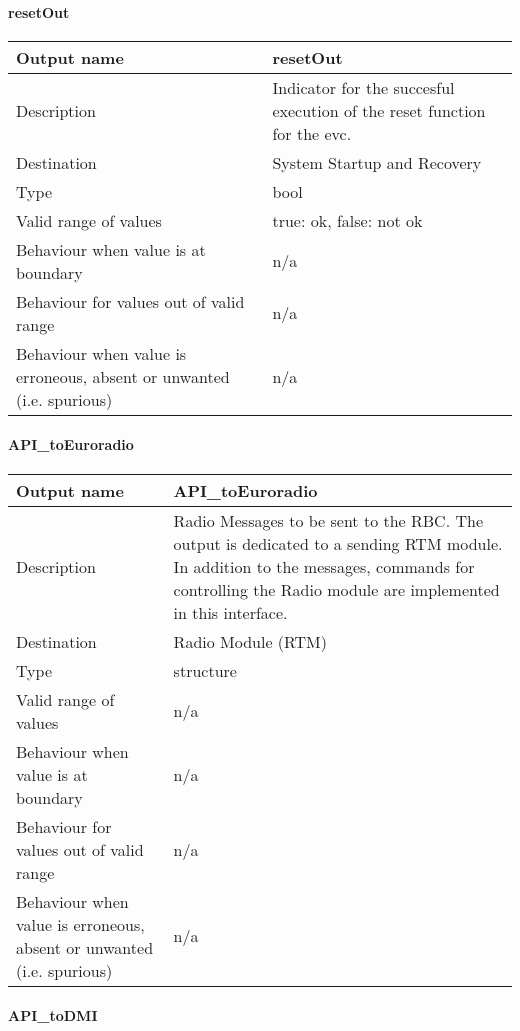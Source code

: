 \paragraph{resetOut}

\begin{longtable}{p{}p{}}
\toprule
Output name				& resetOut \\
\midrule
Description				& Indicator for the succesful execution of the reset function for the evc. \\
\midrule
Destination				& System Startup and Recovery \\ 
\midrule
Type					& bool \\
\midrule
Valid range of values	& true: ok, false: not ok \\
\midrule
Behaviour when value is at boundary	& n/a \\
\midrule
Behaviour for values out of valid range	& n/a \\
\midrule
Behaviour when value is erroneous, absent or unwanted (i.e. spurious) & n/a \\
\bottomrule
\end{longtable}


\paragraph{API\_toEuroradio}

\begin{longtable}{p{}p{}}
\toprule
Output name				& API\_toEuroradio \\
\midrule
Description				& Radio Messages to be sent to the RBC. The output is dedicated to a sending RTM module. In addition to the messages, commands for controlling the Radio module are implemented in this interface.  \\
\midrule
Destination				& Radio Module (RTM) \\ 
\midrule
Type					& structure \\
\midrule
Valid range of values	& n/a \\
\midrule
Behaviour when value is at boundary	& n/a \\
\midrule
Behaviour for values out of valid range	& n/a \\
\midrule
Behaviour when value is erroneous, absent or unwanted (i.e. spurious) & n/a \\
\bottomrule
\end{longtable}


\paragraph{API\_toDMI}


